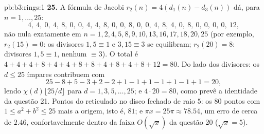 \begin{solution}{pb:b3:rings:1}
\textbf{25.} A fórmula de Jacobi $r_2(n) = 4(d_1(n) - d_3(n))$ dá, para $n = 1, \dots, 25$:
\[
4,\ 4,\ 0,\ 4,\ 8,\ 0,\ 0,\ 4,\ 4,\ 8,\ 0,\ 0,\ 8,\ 0,\ 0,\
4,\ 8,\ 4,\ 0,\ 8,\ 0,\ 0,\ 0,\ 0,\ 12,
\]
não nula exatamente em $n = 1, 2, 4, 5, 8, 9, 10, 13, 16, 17, 18,
20, 25$ (por exemplo, $r_2(15) = 0$: os divisores $1, 5 \equiv 1$ e
$3, 15 \equiv 3$ se equilibram; $r_2(20) = 8$: divisores $1, 5
\equiv 1$, nenhum $\equiv 3$). O total é
$4 + 4 + 4 + 8 + 4 +
4 + 8 + 8 + 4 + 8 + 4 + 8 + 12 = 80$. Do lado dos divisores: os $d \leq 25$ ímpares contribuem com
\[
25 - 8 + 5 - 3 + 2 - 2 + 1 - 1 + 1 - 1 + 1 - 1 + 1 = 20,
\]
lendo $\chi(d)\lfloor 25/d\rfloor$ para $d = 1, 3, 5, \dots,
25$; e $4 \cdot 20 = 80$, como prevê a identidade da questão 21.
Pontos do reticulado no disco fechado de raio $5$: os $80$ pontos
com $1 \leq a^2 + b^2 \leq 25$ mais a origem, isto é, $81$; e $\pi x = 25\pi \approx 78.54$, um erro de cerca de
$2.46$, confortavelmente dentro da faixa $O(\sqrt x)$ da questão 20
($\sqrt x = 5$).
\end{solution}
